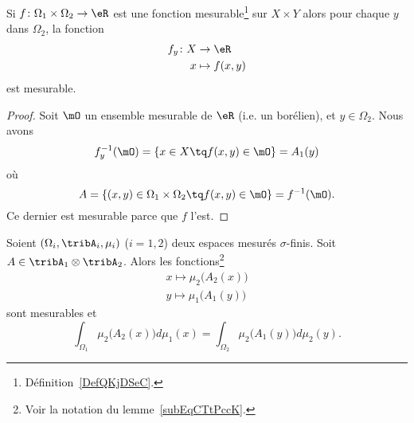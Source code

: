 					 \begin{corollary}
					 Si \( f\colon \Omega_1\times \Omega_2\to \eR\) est une fonction mesurable\footnote{Définition~\ref{DefQKjDSeC}.} sur \( X\times Y\) alors pour chaque \( y\) dans \( \Omega_2\), la fonction
					 \begin{equation}
					 \begin{aligned}
					 f_y\colon X & \to \eR        \\
						 x           & \mapsto f(x,y)
						 \end{aligned}
						 \end{equation}
						 est mesurable.
						 \end{corollary}

						 \begin{proof}
						 Soit \( \mO\) un ensemble mesurable de \( \eR\) (i.e. un borélien), et \( y\in \Omega_2\). Nous avons
						 \begin{equation}
f_y^{-1}(\mO)=\{ x\in X\tq f(x,y)\in \mO \}=A_1(y)
	\end{equation}
	où
	\begin{equation}
	A=\{ (x,y)\in \Omega_1\times \Omega_2\tq f(x,y)\in \mO \}=f^{-1}(\mO).
	\end{equation}
	Ce dernier est mesurable parce que \( f\) l'est.
	\end{proof}

	\begin{theorem}    \label{ThoCCIsLhO}
	Soient \( (\Omega_i,\tribA_i,\mu_i)\) (\( i=1,2\)) deux espaces mesurés \( \sigma\)-finis. Soit \( A\in\tribA_1\otimes \tribA_2\). Alors les fonctions\footnote{Voir la notation du lemme~\ref{subEqCTtPccK}.}
	\begin{subequations}
	\begin{align}
	x\mapsto\mu_2\big( A_2(x) \big) \\
		y\mapsto\mu_1\big( A_1(y) \big)
		\end{align}
		\end{subequations}
		sont mesurables et
		\begin{equation}    \label{EqRKXwsQJ}
		\int_{\Omega_1}\mu_2\big( A_2(x) \big)d\mu_1(x)=\int_{\Omega_2}\mu_2\big( A_1(y) \big)d\mu_2(y).
		\end{equation}
		\end{theorem}


